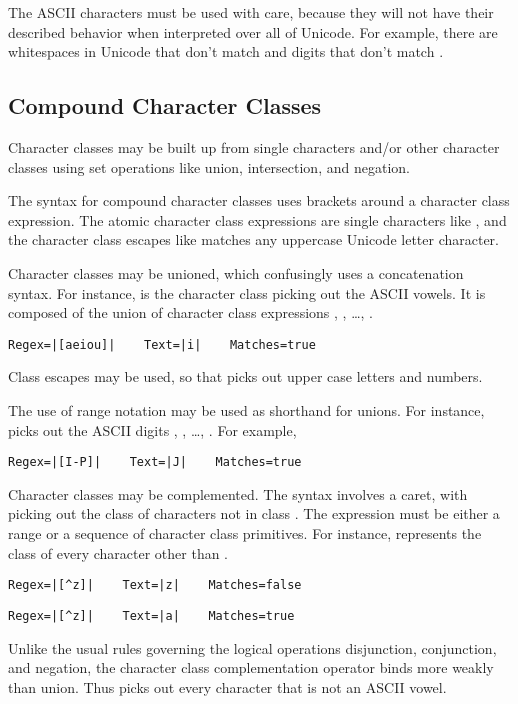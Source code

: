 The ASCII characters must be used with care, because they will not
have their described behavior when interpreted over all of Unicode.
For example, there are whitespaces in Unicode that don't match
 and digits that don't match .

\subsection{Compound Character Classes}

Character classes may be built up from single characters and/or other
character classes using set operations like union, intersection, and
negation.

The syntax for compound character classes uses brackets around a
character class expression.  The atomic character class expressions
are single characters like , and the character class escapes
like  matches any uppercase Unicode letter character.

Character classes may be unioned, which confusingly uses a
concatenation syntax.  For instance, \code{[aeiou]} is the character
class picking out the ASCII vowels.  It is composed of the union of
character class expressions , , \ldots, .  
%
\begin{verbatim}
Regex=|[aeiou]|    Text=|i|    Matches=true
\end{verbatim}
%
Class escapes may be used, so that \code{[{\bk}p\{Lu\}{\bk}p\{N\}]}
picks out upper case letters and numbers.

The use of range notation may be used as shorthand for unions.
For instance, \code{[0-9]} picks out the ASCII digits ,
, \ldots, .  For example,
%
\begin{verbatim}
Regex=|[I-P]|    Text=|J|    Matches=true
\end{verbatim}

Character classes may be complemented.  The syntax involves a caret,
with \code{[\^{}\codeVar{A}]} picking out the class of characters not
in class .  The expression  must be either a
range or a sequence of character class primitives.  For instance,
\code{[\^{}z]} represents the class of every character other than
.  
%
\begin{verbatim}
Regex=|[^z]|    Text=|z|    Matches=false
\end{verbatim}
%
\begin{verbatim}
Regex=|[^z]|    Text=|a|    Matches=true
\end{verbatim}
%
Unlike the usual rules governing the logical operations disjunction,
conjunction, and negation, the character class complementation
operator binds more weakly than union.  Thus \code{[\^{}aeiou]} picks
out every character that is not an ASCII vowel.

